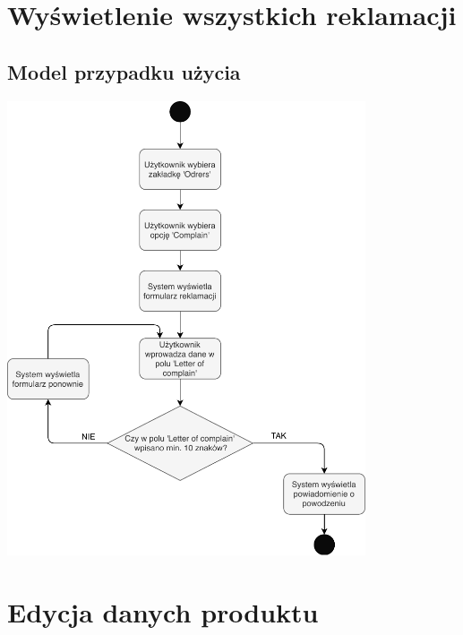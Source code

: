 \documentclass[12pt]{report}
\begin{document}
	
	\section{Wyświetlenie wszystkich reklamacji}
		\subsection{Model przypadku użycia}
			\begin{center}
				\includegraphics[width=300pt]{reklamacja.pdf}
			\end{center}
	
	
	\section{Edycja danych produktu}
\end{document}
